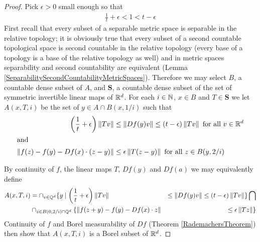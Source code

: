 \begin{proof}
Pick $\epsilon >0$ small enough so that 
\begin{align*}
\frac{1}{t} + \epsilon < 1 < t - \epsilon
\end{align*}
First recall that every subset of a separable metric space is separable in the relative topology; it is obviously true that every subset of a second countable topological space is second countable in the relative topology (every base of a topology is a base of the relative topology as well) and in metric spaces separability and second countability are equivalent (Lemma \ref{SeparabilitySecondCountabilityMetricSpaces}).  Therefore we may 
select $B$, a countable dense subset of $A$, and $\mathbf{S}$, a countable dense subset of the set of symmetric invertible linear maps of $\mathbb{R}^d$.  For each $i \in \mathbb{N}$, $x \in B$ and $T \in \mathbf{S}$ we let $A(x,T,i)$ be the set of $y \in A \cap B(x, 1/i)$ such that
\begin{align*}
\left( \frac{1}{t} + \epsilon \right) \left \lVert Tv \right \rVert &\leq \left \lVert Df(y) v \right \rVert \leq (t-\epsilon)\left \lVert Tv \right \rVert \text{ for all $v \in \mathbb{R}^d$} \\
\intertext{and}
\left \lVert f(z) - f(y) - Df(x) \cdot (z-y) \right \rVert &\leq \epsilon \left \lVert T(z-y) \right \rVert \text{ for all $z \in B(y, 2/i)$}
\end{align*}

By continuity of $f$, the linear maps $T$, $Df(y)$ and $Df(a)$ we may equivalently define
\begin{align*}
A(x,T,i) &= \cap_{v \in \mathbb{Q}^d} \lbrace y \mid \left( \frac{1}{t} + \epsilon \right) \left \lVert Tv \right \rVert &\leq \left \lVert Df(y) v \right \rVert \leq (t-\epsilon)\left \lVert Tv \right \rVert \rbrace \bigcap \\
&\cap_{z \in B(0, 2/i) \cap \mathbb{Q}^d} \lbrace \left \lVert f(z+y) - f(y) - Df(x) \cdot z \right \rVert &\leq \epsilon \left \lVert Tz \right \rVert \rbrace 
\end{align*}
Continuity of $f$ and Borel measurability of $Df$ (Theorem \ref{RademachersTheorem}) then show that $A(x,T,i)$ is a Borel subset of $\mathbb{R}^d$.


\end{proof}
